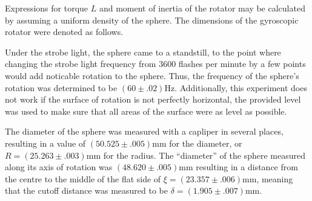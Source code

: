 \begin{paper}
	
	Expressions for torque \( L \) and moment of inertia of the rotator may be calculated by assuming a uniform density of the sphere. The dimensions of the gyroscopic rotator were denoted as follows.\\
	

	
Under the strobe light, the sphere came to a standstill, to the point where changing the strobe light frequency from 3600 flashes per minute by a few points would add noticable rotation to the sphere.
Thus, the frequency of the sphere's rotation was determined to be $(60\pm.02)\si{\hertz}$.
Additionally, this experiment does not work if the surface of rotation is not perfectly horizontal, the provided level was used to make sure that all areas of the surface were as level as possible.

The diameter of the sphere was measured with a capliper in several places, resulting in a value of $(50.525\pm.005)\si{\milli\meter}$ for the diameter, or $R=(25.263\pm.003)\si{\milli\meter}$ for the radius.
The ``diameter'' of the sphere measured along its axis of rotation was $(48.620\pm.005)\si{\milli\meter}$ resulting in a distance from the centre to the middle of the flat side of $\xi=(23.357\pm.006)\si{\milli\meter}$, meaning that the cutoff distance was measured to be $\delta=(1.905\pm.007)\si{\milli\meter}$.


\end{paper}
